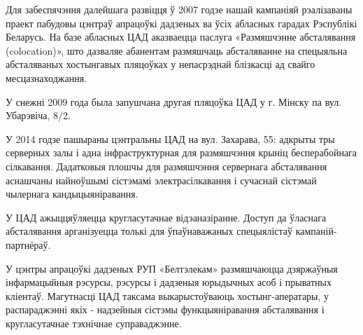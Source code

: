Для забеспячэння далейшага развіцця ў 2007 годзе нашай кампаніяй рэалізаваны праект пабудовы цэнтраў апрацоўкі дадзеных ва ўсіх абласных гарадах Рэспублікі Беларусь. На базе абласных ЦАД аказваецца паслуга «Размяшчэнне абсталявання (colocation)», што дазваляе абанентам размяшчаць абсталяванне на спецыяльна абсталяваных хостынгавых пляцоўках у непасрэднай блізкасці ад свайго месцазнаходжання.

У снежні 2009 года была запушчана другая пляцоўка ЦАД у г. Мінску па вул. Убарэвіча, 8/2.

У 2014 годзе пашыраны цэнтральны ЦАД на вул. Захарава, 55: адкрыты тры серверных залы і адна інфраструктурная для размяшчэння крыніц бесперабойнага сілкавання. Дадатковыя плошчы для размяшчэння сервернага абсталявання аснашчаны найноўшымі сістэмамі электрасілкавання і сучаснай сістэмай чылернага кандыцыяніравання.

У ЦАД ажыццяўляецца кругласутачнае відэаназіранне. Доступ да ўласнага абсталявання арганізуецца толькі для ўпаўнаважаных спецыялістаў кампаній-партнёраў.

У цэнтры апрацоўкі дадзеных РУП «Белтэлекам» размяшчаюцца дзяржаўныя інфармацыйныя рэсурсы, рэсурсы і дадзеныя юрыдычных асоб і прыватных кліентаў. Магутнасці ЦАД таксама выкарыстоўваюць хостынг-аператары, у распараджэнні якіх - надзейныя сістэмы функцыяніравання абсталявання і кругласутачнае тэхнічнае суправаджэнне.
